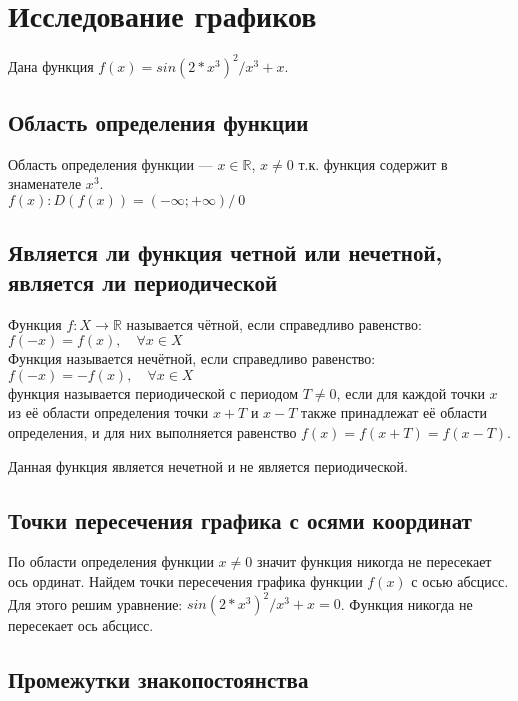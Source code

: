 \section{Исследование графиков}

Дана функция $f(x) = sin(2*x^3)^2/x^3 + x$. 


\subsection{Область определения функции}

Область определения функции --- $x \in \mathbb{R}$, $x \neq 0$ т.к. функция содержит в знаменателе $x^3$. \\$f(x):D(f(x)) = (-\infty; +\infty) /\ 0$

\subsection{Является ли функция четной или нечетной, является ли периодической}

Функция $f:X \to \mathbb{R}$ называется чётной, если справедливо равенство:\\
$f(-x)=f(x),\quad \forall x\in X$\\
Функция называется нечётной, если справедливо равенство:\\
$f(-x)=-f(x),\quad \forall x\in X$\\
функция называется периодической с периодом  $T\neq 0$, если для каждой точки $x$ из её области определения точки $x+T$ и $x-T$ также принадлежат её области определения, и для них выполняется равенство $f(x)=f(x+T)=f(x-T)$.

Данная функция является нечетной и не является периодической.

\subsection{Точки пересечения графика с осями координат}

По области определения функции $x \neq 0$ значит функция никогда не пересекает ось ординат.
Найдем точки пересечения графика функции $f(x)$ с осью абсцисс. Для этого решим уравнение: $sin(2*x^3)^2/x^3 + x = 0$. Функция никогда не пересекает ось абсцисс.

\subsection{Промежутки знакопостоянства}

